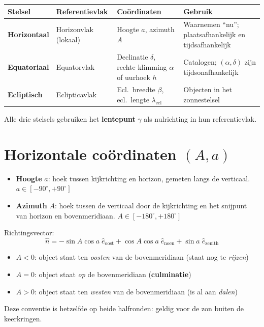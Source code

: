 \documentclass[11pt, a4paper]{article}
\newcommand{\graden}{^{\circ}}
\begin{document}
\begin{center}
\renewcommand{\arraystretch}{1.4}
\begin{tabular}{p{3.2cm} p{3.5cm} p{3.5cm} p{4cm}}
\toprule
\textbf{Stelsel} & \textbf{Referentievlak} & \textbf{Coördinaten} & \textbf{Gebruik} \\
\midrule
\textbf{Horizontaal} & Horizonvlak (lokaal) & Hoogte $a$, azimuth $A$ & Waarnemen ``nu''; plaatsafhankelijk en tijdsafhankelijk \\[4pt]
\textbf{Equatoriaal} & Equatorvlak & Declinatie $\delta$, rechte klimming $\alpha$ of uurhoek $h$ & Catalogen; $(\alpha,\delta)$ zijn tijdsonafhankelijk \\[4pt]
\textbf{Ecliptisch} & Eclipticavlak & Ecl.\ breedte $\beta$, ecl.\ lengte $\lambda_\mathrm{ecl}$ & Objecten in het zonnestelsel \\
\bottomrule
\end{tabular}
\end{center}

Alle drie stelsels gebruiken het \textbf{lentepunt} $\gamma$ als nulrichting in hun referentievlak.

\section{Horizontale coördinaten $(A, a)$}

\begin{formule}[Definities]
\begin{itemize}[leftmargin=1.5em]
  \item \textbf{Hoogte} $a$: hoek tussen kijkrichting en horizon, gemeten langs de verticaal.
    \quad $a \in [-90\graden, +90\graden]$
  \item \textbf{Azimuth} $A$: hoek tussen de verticaal door de kijkrichting en het snijpunt van horizon en bovenmeridiaan.
    \quad $A \in [-180\graden, +180\graden]$
\end{itemize}
Richtingsvector:
\[
  \hat{n} = -\sin A\cos a\;\hat{e}_\mathrm{oost}
           + \cos A\cos a\;\hat{e}_\mathrm{noen}
           + \sin a\;\hat{e}_\mathrm{zenith}
\]
\end{formule}

\begin{weetje}
\begin{itemize}[leftmargin=1.5em]
  \item $A < 0$: object staat ten \emph{oosten} van de bovenmeridiaan (staat nog te \emph{rijzen})
  \item $A = 0$: object staat \emph{op} de bovenmeridiaan (\textbf{culminatie})
  \item $A > 0$: object staat ten \emph{westen} van de bovenmeridiaan (is al aan \emph{dalen})
\end{itemize}
Deze conventie is hetzelfde op beide halfronden: geldig voor de zon buiten de keerkringen.
\end{weetje}
\end{document}
